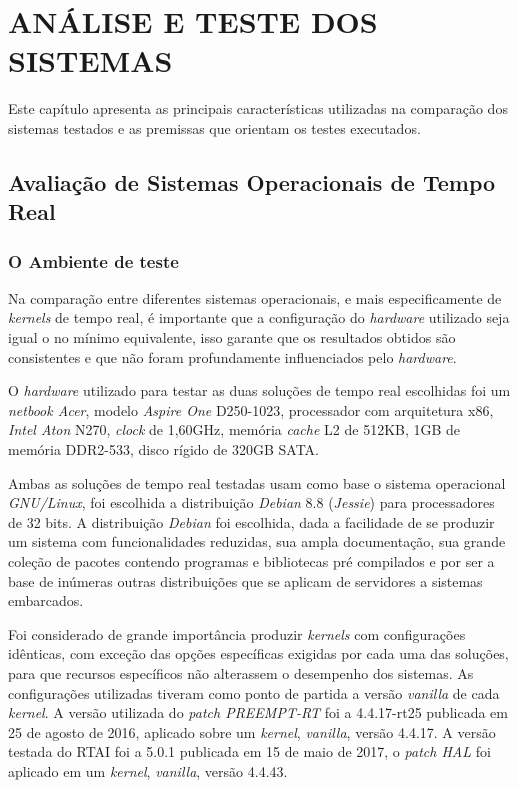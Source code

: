 \chapter{ANÁLISE E TESTE DOS SISTEMAS}
\label{cap:analiseemetodos}

Este capítulo apresenta as principais características utilizadas na comparação dos sistemas testados e as premissas que orientam os testes executados.

\section{Avaliação de Sistemas Operacionais de Tempo Real}
\subsection{O Ambiente de teste}

Na comparação entre diferentes sistemas operacionais, e mais especificamente de \textit{kernels} de tempo real,  é importante que a configuração do \textit{hardware} utilizado seja igual o no mínimo equivalente, isso garante que os resultados obtidos são consistentes e que não foram profundamente influenciados pelo \textit{hardware}.

O \textit{hardware} utilizado para testar as duas soluções de tempo real escolhidas foi um \textit{netbook Acer}, modelo \textit{Aspire One} D250-1023, processador com arquitetura x86, \textit{Intel Aton} N270, \textit{clock} de 1,60GHz, memória \textit{cache} L2 de 512KB, 1GB de memória DDR2-533, disco rígido de 320GB SATA.

Ambas as soluções de tempo real testadas usam como base o sistema operacional \textit{GNU/Linux}, foi escolhida a distribuição \textit{Debian} 8.8 (\textit{Jessie}) para processadores de 32 bits. A distribuição \textit{Debian} foi escolhida, dada a facilidade de se produzir um sistema com funcionalidades reduzidas, sua ampla documentação, sua grande coleção de pacotes contendo programas e bibliotecas pré compilados e por ser a base de inúmeras outras distribuições que se aplicam de servidores a sistemas embarcados.

Foi considerado de grande importância produzir \textit{kernels} com configurações idênticas, com exceção das opções específicas exigidas por cada uma das soluções, para que recursos específicos não alterassem o desempenho dos sistemas. As configurações utilizadas tiveram como ponto de partida a versão \textit{vanilla} de cada \textit{kernel}. A versão utilizada do \textit{patch PREEMPT-RT} foi a 4.4.17-rt25 publicada em 25 de agosto de 2016, aplicado sobre um \textit{kernel}, \textit{vanilla}, versão 4.4.17. A versão testada do RTAI foi a 5.0.1 publicada em 15 de maio de 2017, o \textit{patch HAL} foi aplicado em um \textit{kernel}, \textit{vanilla}, versão 4.4.43.
	

